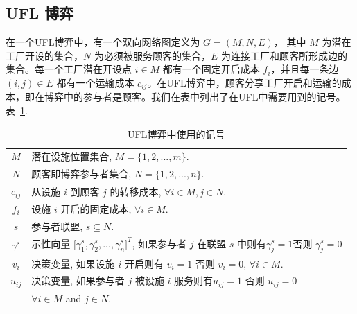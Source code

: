 \documentclass[UTF8]{article}
\begin{document}
  \subsection{UFL 博弈}\label{section:UFL}
在一个UFL博弈中，有一个双向网络图定义为 $G=(M,N,E)$， 其中 $M$ 为潜在工厂开设的集合，$N$ 为必须被服务顾客的集合，$E$ 为连接工厂和顾客所形成边的集合。每一个工厂潜在开设点 $i \in M$ 都有一个固定开启成本 $f_i$，并且每一条边 $(i,j) \in E$ 都有一个运输成本 $c_{ij}$。在UFL博弈中，顾客分享工厂开启和运输的成本，即在博弈中的参与者是顾客。我们在表中列出了在UFL中需要用到的记号。
表~\ref{table:notationsUFL}.
\begin{table}[H]
\vspace{-2mm}
\tabcolsep=7pt
\small
\renewcommand\arraystretch{1.5}
\caption{\label{table:notationsUFL} UFL博弈中使用的记号}
\begin{tabular}[!h]{c c}
\hline
\multicolumn{1}{c}{$M$} &\multicolumn{1}{l}{潜在设施位置集合, $M=\big\{1,2,...,m\big\}$.}\\
\multicolumn{1}{c}{$N$} &\multicolumn{1}{l}{顾客即博弈参与者集合, $N=\big\{1,2,...,n\big\}$.}\\
\multicolumn{1}{c}{$c_{ij}$} &\multicolumn{1}{l}{从设施 $i$ 到顾客 $j$ 的转移成本, $\forall i \in M, j \in N$.}\\
\multicolumn{1}{c}{$f_i$} &\multicolumn{1}{l}{设施 $i$ 开启的固定成本, $\forall i \in M$.}\\
\multicolumn{1}{c}{$s$} &\multicolumn{1}{l}{参与者联盟, $s \subseteq N$.}\\
\multicolumn{1}{c}{$\gamma^s$} &\multicolumn{1}{l}{示性向量 $\big[ \gamma^{s}_1,\gamma^{s}_2,...,\gamma^{s}_{n}\big]^T$, 如果参与者 $j$ 在联盟 $s$ 中则有$\gamma^{s}_j=1$否则 $\gamma^{s}_j=0$}\\
\multicolumn{1}{c}{$v_i$} &\multicolumn{1}{l}{决策变量, 如果设施 $i$ 开启则有 $v_i=1$ 否则 $v_i=0$, $\forall i \in M$.}\\
\multicolumn{1}{c}{$u_{ij}$} &\multicolumn{1}{l}{决策变量, 如果参与者 $j$ 被设施 $i$ 服务则有$u_{ij}=1$ 否则 $u_{ij}=0$}\\
\multicolumn{1}{c}{} &\multicolumn{1}{l}{ $\forall i \in M$ and $j \in N$.}\\
\hline
\end{tabular}
\vspace{-3mm}
\end{table}
\end{document}
